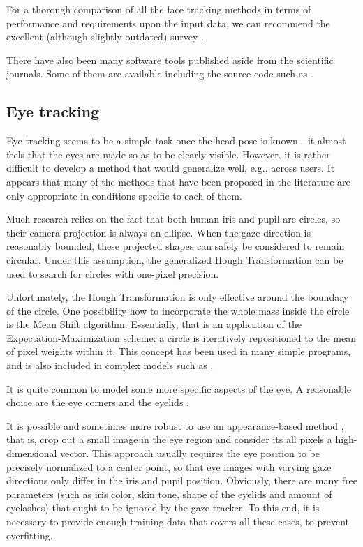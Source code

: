 For a thorough comparison of all the face tracking methods in terms of performance and requirements upon the input data, we can recommend the excellent (although slightly outdated) survey \cite{murphy-chutorian09}.

There have also been many software tools published aside from the scientific journals.
Some of them are available including the source code such as \cite{eviacam,eyecam}.

\subsection{Eye tracking}
\label{s:related-gazetracking}

Eye tracking seems to be a simple task once the head pose is known---it almost feels that the eyes are made so as to be clearly visible.
However, it is rather difficult to develop a method that would generalize well, e.g., across users.
It appears that many of the methods that have been proposed in the literature are only appropriate in conditions specific to each of them.

Much research relies on the fact that both human iris and pupil are circles, so their camera projection is always an ellipse.
When the gaze direction is reasonably bounded, these projected shapes can safely be considered to remain circular.
Under this assumption, the generalized Hough Transformation can be used to search for circles with one-pixel precision.

Unfortunately, the Hough Transformation is only effective around the boundary of the circle.
One possibility how to incorporate the whole mass inside the circle is the Mean Shift algorithm.
Essentially, that is an application of the Expectation-Maximization scheme: a circle is iteratively repositioned to the mean of pixel weights within it.
This concept has been used in many simple programs, and is also included in complex models such as \cite{wang16}.

It is quite common to model some more specific aspects of the eye.
A reasonable choice are the eye corners \cite{zhu12} and the eyelids \cite{yuille92}.

It is possible and sometimes more robust to use an appearance-based method \cite{tan02}, that is, crop out a small image in the eye region and consider its all pixels a high-dimensional vector.
This approach usually requires the eye position to be precisely normalized to a center point, so that eye images with varying gaze directions only differ in the iris and pupil position.
Obviously, there are many free parameters (such as iris color, skin tone, shape of the eyelids and amount of eyelashes) that ought to be ignored by the gaze tracker.
To this end, it is necessary to provide enough training data that covers all these cases, to prevent overfitting.

